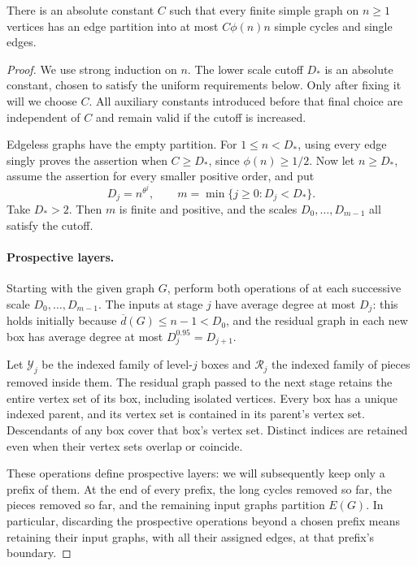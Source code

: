 \begin{proposition}\label{prop:induction-bound}
There is an absolute constant \(C\) such that every finite simple
graph on \(n\ge1\) vertices has an edge partition into at most
\(C\phi(n)n\) simple cycles and single edges.
\end{proposition}

\begin{proof}
We use strong induction on \(n\). The lower scale cutoff \(D_*\)
is an absolute constant, chosen to satisfy the uniform requirements
below. Only after fixing it will we choose \(C\). All auxiliary
constants introduced before that final choice are independent of
\(C\) and remain valid if the cutoff is increased.

Edgeless graphs have the empty partition. For \(1\le n<D_*\),
using every edge singly proves the assertion when \(C\ge D_*\),
since \(\phi(n)\ge1/2\). Now let \(n\ge D_*\), assume the
assertion for every smaller positive order, and put
\[
 D_j=n^{\theta^j},\qquad
 m=\min\{j\ge0:D_j<D_*\}.
\]
Take \(D_*>2\). Then \(m\) is finite and positive, and the
scales \(D_0,\ldots,D_{m-1}\) all satisfy the cutoff.

\paragraph{Prospective layers.}
Starting with the given graph \(G\), perform both operations of
 at each successive scale
\(D_0,\ldots,D_{m-1}\). The inputs at stage \(j\) have average
degree at most \(D_j\): this holds initially because
\(\overline d(G)\le n-1<D_0\), and the residual graph in each
new box has average degree at most
\(D_j^{0.95}=D_{j+1}\).

Let \(\mathcal Y_j\) be the indexed family of level-\(j\)
boxes and \(\mathcal R_j\) the indexed family of pieces removed
inside them. The residual graph passed to the next stage retains
the entire vertex set of its box, including isolated vertices.
Every box has a unique indexed parent, and its vertex set is
contained in its parent's vertex set. Descendants of any box
cover that box's vertex set. Distinct indices are retained even
when their vertex sets overlap or coincide.

These operations define prospective layers: we will subsequently
keep only a prefix of them. At the end of every prefix, the long
cycles removed so far, the pieces removed so far, and the remaining
input graphs partition \(E(G)\). In particular, discarding the
prospective operations beyond a chosen prefix means retaining
their input graphs, with all their assigned edges, at that
prefix's boundary.


\end{proof}
